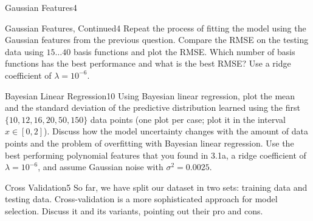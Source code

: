 \begin{questions}
\begin{question}{Gaussian Features}{4}
\begin{answer}\end{answer}

\end{question}


\begin{question}{Gaussian Features, Continued}{4}
Repeat the process of fitting the model using the Gaussian features from the previous question. Compare the RMSE on the testing data using $15 \ldots 40$ basis functions and plot the RMSE. Which number of basis functions has the best performance and what is the best RMSE? Use a ridge coefficient of $\lambda=10^{-6}$.

\begin{answer}\end{answer}

\end{question}


\begin{question}{Bayesian Linear Regression}{10}
Using Bayesian linear regression, plot the mean and the standard deviation of the predictive distribution learned using the first $\{10, 12, 16, 20, 50, 150\}$ data points (one plot per case; plot it in the interval $x\in[0,2]$).
Discuss how the model uncertainty changes with the amount of data points and the problem of overfitting with Bayesian linear regression.
Use the best performing polynomial features that you found in 3.1a, a ridge coefficient of $\lambda=10^{-6}$, and assume Gaussian noise with $\sigma^2=0.0025$. 

\begin{answer}\end{answer}
\end{question}


\begin{question}[bonus]{Cross Validation}{5}
So far, we have split our dataset in two sets: training data and testing data. Cross-validation is a more sophisticated approach for model selection. Discuss it and its variants, pointing out their pro and cons.
\end{question}



\end{questions}
